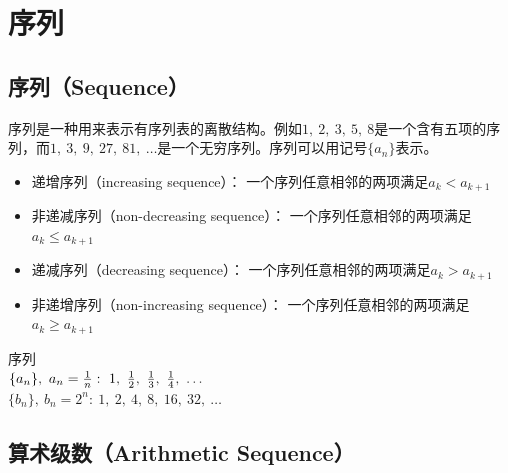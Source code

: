 \documentclass[12pt, openany, oneside]{book}
\begin{document}
\begin{table}[H]
	\centering
	\caption{埃拉托斯特尼筛法}
\end{table}

\newpage

\section{序列}

\subsection{序列（Sequence）}

序列是一种用来表示有序列表的离散结构。例如$ 1,\ 2,\ 3,\ 5,\ 8 $是一个含有五项的序列，而$ 1,\ 3,\ 9,\ 27,\ 81,\ \dots $是一个无穷序列。序列可以用记号$ \{a_n\} $表示。

\begin{itemize}
	\item 递增序列（increasing sequence）： 一个序列任意相邻的两项满足$ a_k < a_{k+1} $
	\item 非递减序列（non-decreasing sequence）： 一个序列任意相邻的两项满足$ a_k \le a_{k+1} $
	\item 递减序列（decreasing sequence）： 一个序列任意相邻的两项满足$ a_k > a_{k+1} $
	\item 非递增序列（non-increasing sequence）： 一个序列任意相邻的两项满足$ a_k \ge a_{k+1} $
\end{itemize}

\begin{tcolorbox}
	序列\\
	$ \{a_n\},\ a_n = {1 \over n}:\ 1,\ {1 \over 2},\ {1 \over 3},\ {1 \over 4},\ \dots $\\
	$ \{b_n\},\ b_n = 2^n:\ 1,\ 2,\ 4,\ 8,\ 16,\ 32,\ \dots $
\end{tcolorbox}

\vspace{0.5cm}

\subsection{算术级数（Arithmetic Sequence）}
\end{document}
